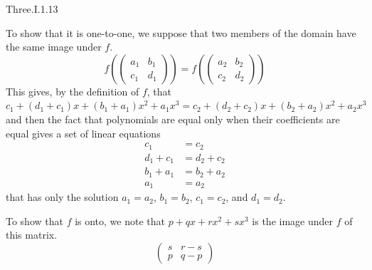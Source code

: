 \begin{ans}{Three.I.1.13}
\begin{exparts}
        To show that it is one-to-one, we suppose that two members of the
        domain have the same image under $f$.
        \begin{equation*}
          f(\begin{pmatrix}
              a_1  &b_1  \\
              c_1  &d_1
            \end{pmatrix})
          =f(\begin{pmatrix}
              a_2  &b_2  \\
              c_2  &d_2
            \end{pmatrix})
        \end{equation*}
        This gives, by the definition of $f$, that
        $c_1+(d_1+c_1)x+(b_1+a_1)x^2+a_1x^3
          =c_2+(d_2+c_2)x+(b_2+a_2)x^2+a_2x^3$
        and then the fact that polynomials are equal only when their
        coefficients are equal gives a set of linear equations
        \begin{align*}
          c_1      &=  c_2      \\
          d_1+c_1  &=  d_2+c_2  \\
          b_1+a_1  &=  b_2+a_2  \\
          a_1      &=  a_2
        \end{align*}
        that has only the solution $a_1=a_2$, $b_1=b_2$, $c_1=c_2$, and
        $d_1=d_2$.

        To show that $f$ is onto, we note that $p+qx+rx^2+sx^3$ is the image
        under $f$ of this matrix.
        \begin{equation*}
          \begin{pmatrix}
            s  &r-s   \\
            p  &q-p
          \end{pmatrix}
        \end{equation*}


\end{exparts}
\end{ans}
